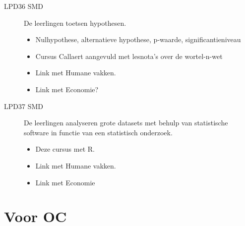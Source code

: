 \documentclass[a4paper,12pt, dutch, oneside ]{book}
\begin{document}
\begin{description}
\item[LPD36 SMD] De leerlingen toetsen hypothesen.
\begin{itemize}
    \item Nulhypothese, alternatieve hypothese, p-waarde, significantieniveau
    \item Cursus Callaert aangevuld met lesnota's over de wortel-n-wet
    \item Link met Humane vakken.
    \item Link met Economie?
\end{itemize}

\item[LPD37 SMD] De leerlingen analyseren grote datasets met behulp van statistische software in functie van een statistisch onderzoek.
\begin{itemize}
    \item Deze cursus met R.
    \item Link met Humane vakken.
    \item Link met Economie
\end{itemize}
\end{description}

\section{Voor OC}
\end{document}
